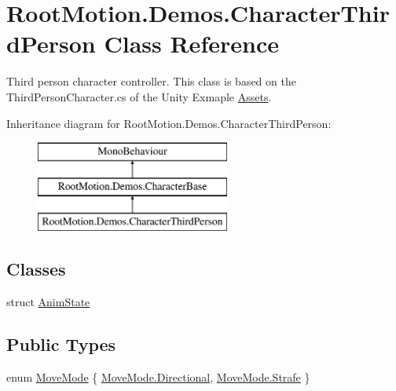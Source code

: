 \hypertarget{class_root_motion_1_1_demos_1_1_character_third_person}{}\section{Root\+Motion.\+Demos.\+Character\+Third\+Person Class Reference}
\label{class_root_motion_1_1_demos_1_1_character_third_person}


Third person character controller. This class is based on the Third\+Person\+Character.\+cs of the Unity Exmaple \mbox{\hyperlink{namespace_assets}{Assets}}.  


Inheritance diagram for Root\+Motion.\+Demos.\+Character\+Third\+Person\+:\begin{figure}[H]
\begin{center}
\leavevmode
\includegraphics[height=3.000000cm]{class_root_motion_1_1_demos_1_1_character_third_person}
\end{center}
\end{figure}
\subsection*{Classes}
\begin{DoxyCompactItemize}
\item 
struct \mbox{\hyperlink{struct_root_motion_1_1_demos_1_1_character_third_person_1_1_anim_state}{Anim\+State}}
\end{DoxyCompactItemize}
\subsection*{Public Types}
\begin{DoxyCompactItemize}
\item 
enum \mbox{\hyperlink{class_root_motion_1_1_demos_1_1_character_third_person_aef170847340acae97eb1c87e647eead2}{Move\+Mode}} \{ \mbox{\hyperlink{class_root_motion_1_1_demos_1_1_character_third_person_aef170847340acae97eb1c87e647eead2ab04a8341537fac392bfd17776491d03c}{Move\+Mode.\+Directional}}, 
\mbox{\hyperlink{class_root_motion_1_1_demos_1_1_character_third_person_aef170847340acae97eb1c87e647eead2a87f0a5a9633c4380bbdee1cd1f2b0b4d}{Move\+Mode.\+Strafe}}
 \}
\end{DoxyCompactItemize}

